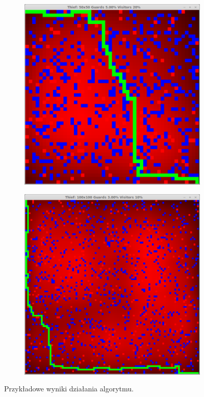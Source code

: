 \documentclass[12pt]{article}
\begin{document}
\begin{figure}
\begin{subfigure}[]{0.5\textwidth}
\end{subfigure}
\begin{subfigure}[]{0.5\textwidth}
\includegraphics[width=\textwidth,keepaspectratio=true]{demo3.png}
\end{subfigure}
\begin{subfigure}[]{0.5\textwidth}
\includegraphics[width=\textwidth,keepaspectratio=true]{demo4.png}
\end{subfigure}
\caption{Przykładowe wyniki działania algorytmu.}
\end{figure}
\end{document}
